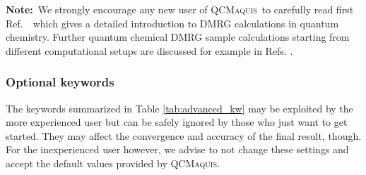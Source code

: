 \documentclass[bibliography=totoc,12pt,a4paper]{scrartcl}
\newcommand{\qcm}{\textsc{QCMaquis}}
\begin{document}
\FloatBarrier
\begin{framed}
\noindent\textbf{Note:}\ We strongly encourage any new user of \qcm\ to carefully read first Ref.\ \ which gives a detailed introduction to
DMRG calculations in quantum chemistry. Further quantum chemical DMRG sample calculations starting from different computational setups are discussed for
example in Refs. \cite{interface,ru-dmrg,fde-dmrg,srdft-dmrg}.
\end{framed}
\subsubsection{Optional keywords}\label{sec:optional-qcm}

The keywords summarized in Table \ref{tab:advanced_kw} may be exploited by the more experienced user but can be safely
ignored by those who just want to get started. They may affect the convergence and accuracy of the final result, though.
For the inexperienced user however, we advise to not change these settings and accept the default values provided by \qcm.

\end{document}

